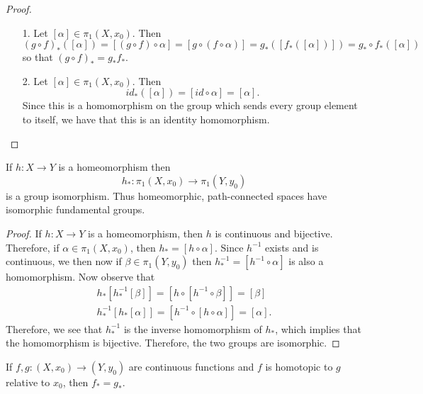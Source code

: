 \documentclass[a4paper,12pt,twoside]{hmcpset}
\begin{document}
\begin{proof}
    \begin{itemize}
        \item[1.] Let $[\alpha] \in \pi_1(X, x_0)$. 
        Then 
        \[
            (g \circ f)_*([\alpha]) = [(g \circ f) \circ \alpha] 
            = [g \circ (f \circ \alpha)]
            = g_*([f_*([\alpha])]) = g_* \circ f_*([\alpha]) 
        \]
        so that $(g \circ f)_* = g_*f_*$.
        
        \item[2.] Let $[\alpha] \in \pi_1(X, x_0)$. Then 
        \[
            id_*([\alpha]) = [id \circ \alpha] = [\alpha].
        \]
        Since this is a homomorphism on the group which sends every
        group element to itself, we have that this is an identity homomorphism.
    \end{itemize}
\end{proof}

\begin{problem}[Theorem 13.20]
    If $h: X \to Y$ is a homeomorphism then 
    \[
        h_*: \pi_1(X, x_0) \to \pi_1(Y, y_0)       
    \]
    is a group isomorphism. Thus homeomorphic, path-connected spaces
    have isomorphic fundamental groups.
\end{problem}

\begin{proof}
    If $h: X \to Y$ is a homeomorphism, then $h$ is continuous and
    bijective. Therefore, if $\alpha \in \pi_1(X, x_0)$, then 
    $h_* = [h \circ \alpha]$. Since $h^{-1}$ exists and is continuous,
    we then now if $\beta \in \pi_1(Y, y_0)$ then 
    $h^{-1}_* = [h^{-1} \circ \alpha]$ is also a homomorphism. Now
    observe that 
    \begin{gather*}
        h_*[h^{-1}_*[\beta]] = [h \circ [h^{-1} \circ \beta]] = [\beta]\\
        h^{-1}_*[h_*[\alpha]] = [h^{-1} \circ [h \circ \alpha]] = [\alpha].
    \end{gather*}
    Therefore, we see that $h^{-1}_*$ is the inverse homomorphism of
    $h_*$, which implies that the homomorphism is bijective.
    Therefore, the two groups are isomorphic.
\end{proof}



\begin{problem}[Theorem 13.22]
    If $f, g : (X, x_0) \to (Y, y_0)$ are continuous functions and $f$
    is homotopic to $g$ relative to $x_0$, then $f_* = g_*$.
\end{problem}
\end{document}
